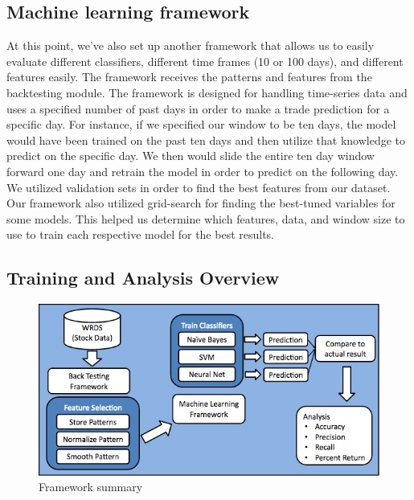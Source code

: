 \documentclass{article}
\begin{document}
\subsection{Machine learning framework}
At this point, we've also set up another framework that allows us to easily evaluate different classifiers, different time frames (10 or 100 days), and different features easily. The framework receives the patterns and features from the backtesting module. The framework is designed for handling time-series data and uses a specified number of past days in order to make a trade prediction for a specific day. For instance, if we specified our window to be ten days, the model would have been trained on the past ten days and then utilize that knowledge to predict on the specific day. We then would slide the entire ten day window forward one day and retrain the model in order to predict on the following day. We utilized validation sets in order to find the best features from our dataset. Our framework also utilized grid-search for finding the best-tuned variables for some models. This helped us determine which features, data, and window size to use to train each respective model for the best results.

\subsection{Training and Analysis Overview}
\begin{figure}[h!]
\begin{center}
        \includegraphics[scale=0.3]{summary_fig}
        \caption{Framework summary}
\end{center}
\end{figure}
\end{document}
